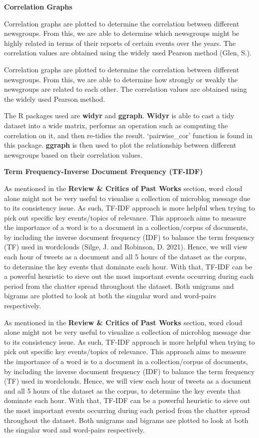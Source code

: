 \documentclass{acm_proc_article-sp}
\begin{document}
\textbf{Correlation Graphs}

Correlation graphs are plotted to determine the correlation between
different newsgroups. From this, we are able to determine which
newsgroups might be highly related in terms of their reports of certain
events over the years. The correlation values are obtained using the
widely used Pearson method (Glen, S.).

Correlation graphs are plotted to determine the correlation between
different newsgroups. From this, we are able to determine how strongly
or weakly the newsgroups are related to each other. The correlation
values are obtained using the widely used Pearson method.

The R packages used are \textbf{widyr} and \textbf{ggraph}.
\textbf{Widyr} is able to cast a tidy dataset into a wide matrix,
performs an operation such as computing the correlation on it, and then
re-tidies the result. `pairwise\_cor' function is found in this package.
\textbf{ggraph} is then used to plot the relationship between different
newsgroups based on their correlation values.

\textbf{Term Frequency-Inverse Document Frequency (TF-IDF)}

As mentioned in the \textbf{Review \& Critics of Past Works} section,
word cloud alone might not be very useful to visualise a collection of
microblog message due to its consistency issue. As such, TF-IDF approach
is more helpful when trying to pick out specific key events/topics of
relevance. This approach aims to measure the importance of a word is to
a document in a collection/corpus of documents, by including the inverse
document frequency (IDF) to balance the term frequency (TF) used in
wordclouds (Silge, J. and Robinson, D. 2021). Hence, we will view each
hour of tweets as a document and all 5 hours of the dataset as the
corpus, to determine the key events that dominate each hour. With that,
TF-IDF can be a powerful heuristic to sieve out the most important
events occurring during each period from the chatter spread throughout
the dataset. Both unigrams and bigrams are plotted to look at both the
singular word and word-pairs respectively.

As mentioned in the \textbf{Review \& Critics of Past Works} section,
word cloud alone might not be very useful to visualize a collection of
microblog message due to its consistency issue. As such, TF-IDF approach
is more helpful when trying to pick out specific key events/topics of
relevance. This approach aims to measure the importance of a word is to
a document in a collection/corpus of documents, by including the inverse
document frequency (IDF) to balance the term frequency (TF) used in
wordclouds. Hence, we will view each hour of tweets as a document and
all 5 hours of the dataset as the corpus, to determine the key events
that dominate each hour. With that, TF-IDF can be a powerful heuristic
to sieve out the most important events occurring during each period from
the chatter spread throughout the dataset. Both unigrams and bigrams are
plotted to look at both the singular word and word-pairs respectively.
\end{document}
